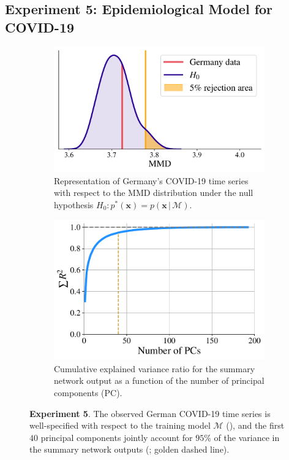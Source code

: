\documentclass[twoside,11pt]{article}
\newcommand{\numberCovid}{5}
\newcommand{\x}{\boldsymbol{x}}
\newcommand{\0}{\boldsymbol{0}}
\newcommand{\given}{\,|\,}
\newcommand{\M}{\mathcal{M}}
\begin{document}
\subsection{Experiment \numberCovid: Epidemiological Model for COVID-19}\label{sec:experiment-covid}
\begin{figure}[t]
\centering
    \begin{subfigure}[t]{.53\linewidth}
        \includegraphics[width=\linewidth]{COVID_real_data_MMD_H0.pdf}
        \caption{Representation of Germany's COVID-19 time series with respect to the MMD distribution under the null hypothesis $H_0: p^*(\x)=p(\x\given\mathcal{M})$.}
        \label{fig:exp:covid:mmd-real-data}
    \end{subfigure}
    \hfill
    \begin{subfigure}[t]{.44\linewidth}
        \includegraphics[width=\linewidth]{COVID_PCA_explained_variance.pdf}
        \caption{Cumulative explained variance ratio for the summary network output as a function of the number of principal components (PC).}
        \label{fig:exp:covid:PCA-exp-var}
    \end{subfigure}
    \caption{\textbf{Experiment \numberCovid}. The observed German COVID-19 time series is well-specified with respect to the training model $\M$ (), and the first $40$ principal components jointly account for $95\%$ of the variance in the summary network outputs (; golden dashed line).}
    \label{fig:exp:COVID:real-data-and-PCA}
\end{figure}
\end{document}

